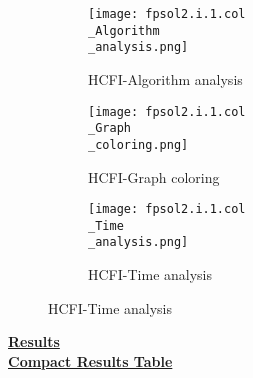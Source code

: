 \documentclass[10pt]{article}
\begin{document}
\graphicspath{{./Core1/Solutions/HCFI/fpsol2.i.1.col}}
\begin{figure}[H]
\begin{subfigure}{.33\textwidth}
  \centering
  \texttt{[image: fpsol2.i.1.col\\\_Algorithm\\\_analysis.png]}
  \caption{HCFI-Algorithm analysis}
   \label{fig:subfig1}
\end{subfigure}%
\begin{subfigure}{.33\textwidth}
  \centering
  \texttt{[image: fpsol2.i.1.col\\\_Graph\\\_coloring.png]}
  \caption{HCFI-Graph coloring}
  \label{fig:subfig2}
\end{subfigure}
\begin{subfigure}{.33\textwidth}
  \centering
  \texttt{[image: fpsol2.i.1.col\\\_Time\\\_analysis.png]}
  \caption{HCFI-Time analysis}
  \end{subfigure}
\end{figure}
\vspace{2cm}
\begin{center}
\hyperlink{page.8}{\textbf{Results}}\\
\vspace{0.5cm}
\hyperlink{page.71}{\textbf{Compact Results Table}}
\end{center}
\pagebreak
\end{document}
